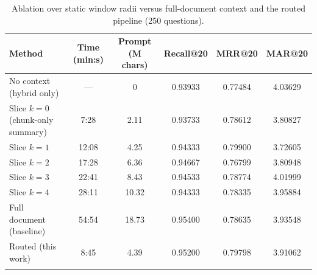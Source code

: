 \documentclass[pdflatex,sn-mathphys-num]{sn-jnl}
\makeatletter
\newif\ifprovenance
\newcommand{\verify}[1]{\ifprovenance\textcolor{red}{{\footnotesize [VERIFY: #1]}}\fi}
\newcommand{\Rec}[1]{Recall@#1}
\newcommand{\MRR}[1]{MRR@#1}
\newcommand{\MAR}[1]{MAR@#1}
\theoremstyle{thmstyleone}%
\theoremstyle{thmstylethree}%
\makeatother
\begin{document}
\begin{table}[htbp]
\caption{Ablation over static window radii versus full-document context and the routed pipeline (250 questions).}\label{tab:sweep}
\setlength{\tabcolsep}{4pt}
\begin{tabular}{@{}p{3.7cm}ccccc@{}}
\toprule
Method & Time (min:s) & Prompt (M chars) & \Rec{20} & \MRR{20} & \MAR{20} \\
\midrule
No context (hybrid only) & --- & 0 & 0.93933 & 0.77484 & 4.03629 \\
Slice $k=0$ (chunk-only summary) & 7:28\footnotemark[1] & 2.11 & 0.93733 & 0.78612 & 3.80827 \\
Slice $k=1$ & 12:08\footnotemark[1] & 4.25 & 0.94333 & 0.79900 & 3.72605 \\
Slice $k=2$ & 17:28\footnotemark[1] & 6.36 & 0.94667 & 0.76799 & 3.80948 \\
Slice $k=3$ & 22:41\footnotemark[1] & 8.43 & 0.94533 & 0.78774 & 4.01999 \\
Slice $k=4$ & 28:11\footnotemark[1] & 10.32 & 0.94333 & 0.78335\footnotemark[2] & 3.95884 \\
Full document (baseline) & 54:54 & 18.73 & 0.95400 & 0.78635 & 3.93548 \\
Routed (this work) & 8:45 & 4.39 & 0.95200 & 0.79798 & 3.91062 \\
\botrule
\end{tabular}
\ifprovenance\footnotetext{\verify{Recall/MRR/MAR: ``METRICS AT N=20'' printouts in \texttt{RnD/ablation\_doc\_slice\_retrieval.ipynb} (tables \texttt{hybrid\_retrieval}, \texttt{ablation\_doc\_slice\_radius\_0..4}, \texttt{anthropic\_control\_table}) and in \texttt{RnD/benchmarking\_retrievals.ipynb} (routed row, own vs baseline). Times: cell~1 comments of \texttt{RnD/ablation\_doc\_slice\_generation.ipynb} for $k=0..4$; \texttt{duration} column of \texttt{RnD/emissions\_data/emissions.csv} for the baseline (3\,294.3\,s, row 2026-03-05T23:59:43) and the routed run (525.3\,s, row 2026-09-25T20:06:47). Energy: \texttt{energy\_consumed} of the same rows and of row 2026-03-05T22:53:27 ($k=3$). Prompt volumes: \texttt{cost.py} re-implementation (Sect.~\ref{sec:complexity}).}}\fi
\end{table}
\end{document}
